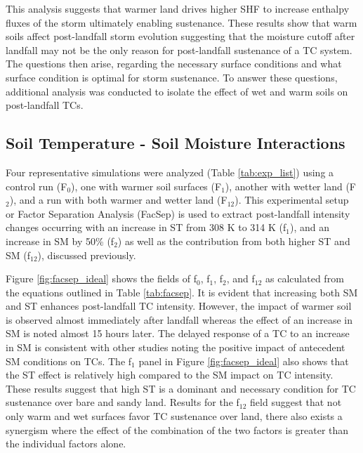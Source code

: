 \documentclass[fleqn,10pt]{wlscirep}
\begin{document}
This analysis suggests that warmer land drives higher SHF to increase enthalpy fluxes of the storm ultimately enabling sustenance. These results show that warm soils affect post-landfall storm evolution suggesting that the moisture cutoff after landfall may not be the only reason for post-landfall sustenance of a TC system. The questions then arise, regarding the necessary surface conditions and what surface condition is optimal for storm sustenance. To answer these questions, additional analysis was conducted to isolate the effect of wet and warm soils on post-landfall TCs.

\subsection*{Soil Temperature - Soil Moisture Interactions}

Four representative simulations were analyzed (Table \ref{tab:exp_list}) using a control run (F$_{0}$), one with warmer soil surfaces (F$_{1}$), another with wetter land (F$_{2}$), and a run with both warmer and wetter land (F$_{12}$). This experimental setup or Factor Separation Analysis\cite{SteinnAlpert1993} (FacSep) is used to extract post-landfall intensity changes occurring with an increase in ST from 308 K to 314 K (f$_{1}$), and an increase in SM by 50\% (f$_{2}$) as well as the contribution from both higher ST and SM (f$_{12}$), discussed previously. 

Figure \ref{fig:facsep_ideal} shows the fields of f$_{0}$, f$_{1}$, f$_{2}$, and f$_{12}$ as calculated from the equations outlined in Table \ref{tab:facsep}. It is evident that increasing both SM and ST enhances post-landfall TC intensity. However, the impact of warmer soil is observed almost immediately after landfall whereas the effect of an increase in SM is noted almost 15 hours later. The delayed response of a TC to an increase in SM is consistent with other studies\cite{kellner2012,Evans2011,Chang2009PossibleDepressions} noting the positive impact of antecedent SM conditions on TCs. The f$_{1}$ panel in Figure \ref{fig:facsep_ideal} also shows that the ST effect is relatively high compared to the SM impact on TC intensity. These results suggest that high ST is a dominant and necessary condition for TC sustenance over bare and sandy land. Results for the f$_{12}$ field suggest that not only warm and wet surfaces favor TC sustenance over land, there also exists a synergism where the effect of the combination of the two factors is greater than the individual factors alone. 
\end{document}
